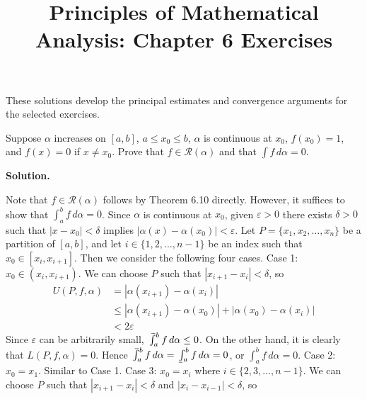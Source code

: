 \documentclass[12pt]{article}
\title{Principles of Mathematical Analysis: Chapter 6 Exercises}
\date{}
\theoremstyle{definition}
\begin{document}
\maketitle
\noindent These solutions develop the principal estimates and convergence arguments for the selected exercises.

Suppose $\alpha$ increases on $[a,b]$, $a\le x_0\le b$, $\alpha$ is continuous at $x_0$, $f(x_0)=1$, and $f(x)=0$ if $x\ne x_0$. Prove that $f\in\mathcal{R}(\alpha)$ and that $\int f\,d\alpha=0$.

\smallskip
\noindent\textbf{Solution.}\quad

Note that $f\in\mathcal{R}(\alpha)$ follows by Theorem 6.10 directly. However, it suffices to show that $\int_a^b f\,d\alpha=0$. Since $\alpha$ is continuous at $x_0$, given $\varepsilon>0$ there exists $\delta>0$ such that $\left\vert x-x_0\right\vert<\delta$ implies $\left\vert\alpha(x)-\alpha(x_0)\right\vert<\varepsilon$. Let $P=\{x_1,x_2,\ldots,x_n\}$ be a partition of $[a,b]$, and let $i\in\{1,2,\ldots,n-1\}$ be an index such that $x_0\in[x_i,x_{i+1}]$. Then we consider the following four cases.
Case 1: $x_0\in(x_i,x_{i+1})$. We can choose $P$ such that $\left\vert x_{i+1}-x_i\right\vert<\delta$, so
\begin{align*}
U(P,f,\alpha)
&=\left\vert\alpha(x_{i+1})-\alpha(x_i)\right\vert \\
&\le\left\vert\alpha(x_{i+1})-\alpha(x_0)\right\vert+\left\vert\alpha(x_0)-\alpha(x_i)\right\vert \\
&<2\varepsilon
\end{align*}
Since $\varepsilon$ can be arbitrarily small, $\mathchoice%
    {\mkern13mu\overline{\vphantom{\intop}\mkern7mu}\mkern-20mu}%
    {\mkern7mu\overline{\vphantom{\intop}\mkern7mu}\mkern-14mu}%
    {\mkern7mu\overline{\vphantom{\intop}\mkern7mu}\mkern-14mu}%
    {\mkern7mu\overline{\vphantom{\intop}\mkern7mu}\mkern-14mu}%
  \int_a^bf\,d\alpha\le 0$. On the other hand, it is clearly that $L(P,f,\alpha)=0$. Hence $\mathchoice%
    {\mkern13mu\overline{\vphantom{\intop}\mkern7mu}\mkern-20mu}%
    {\mkern7mu\overline{\vphantom{\intop}\mkern7mu}\mkern-14mu}%
    {\mkern7mu\overline{\vphantom{\intop}\mkern7mu}\mkern-14mu}%
    {\mkern7mu\overline{\vphantom{\intop}\mkern7mu}\mkern-14mu}%
  \int_a^bf\,d\alpha=\mkern3mu\underline{\vphantom{\intop}\mkern7mu}\mkern-10mu\int_a^b f\,d\alpha=0$, or $\int_a^bf\,d\alpha=0$.
Case 2: $x_0=x_1$. Similar to Case 1.
Case 3: $x_0=x_i$ where $i\in\{2,3,\ldots,n-1\}$. We can choose $P$ such that $\left\vert x_{i+1}-x_i\right\vert<\delta$ and $\left\vert x_i-x_{i-1}\right\vert<\delta$, so
\end{document}
